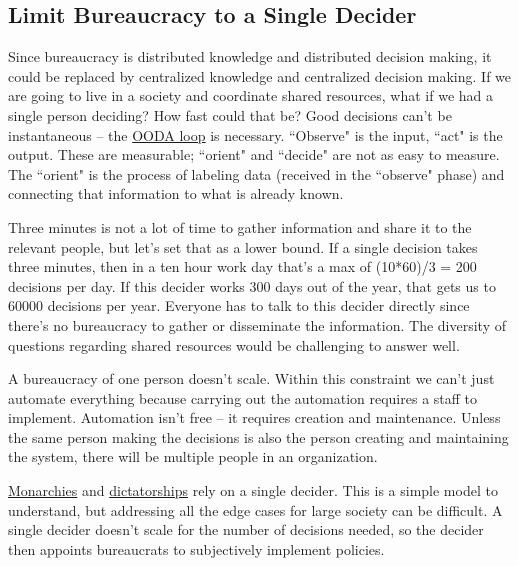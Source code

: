 \subsection{Limit Bureaucracy to a Single Decider\label{sec:single-decider}}

Since bureaucracy is distributed knowledge and distributed decision making, it could be replaced by centralized knowledge and centralized decision making. If we are going to live in a society and coordinate shared resources, what if we had a single person deciding? How fast could that be? Good decisions can't be instantaneous -- the \href{https://en.wikipedia.org/wiki/OODA_loop}{OODA loop} is necessary. 
``Observe" is the input, ``act" is the output. These are measurable; ``orient" and ``decide" are not as easy to measure. The ``orient" is the process of labeling data (received in the ``observe" phase) and connecting that information to what is already known.

Three minutes is not a lot of time to gather information and share it to the relevant people, but let's set that as a lower bound.
If a single decision takes three minutes, then in a ten hour work day that's a max of (10*60)/3 = 200 decisions per day. If this decider works 300 days out of the year, that gets us to 60000 decisions per year. Everyone has to talk to this decider directly since there's no bureaucracy to gather or disseminate the information. The diversity of questions regarding shared resources would be challenging to answer well.

A bureaucracy of one person doesn't scale. Within this constraint we can't just automate everything because carrying out the automation requires a staff to implement. Automation isn't free -- it requires creation and maintenance. Unless the same person making the decisions is also the person creating and maintaining the system, there will be multiple people in an organization.


\href{https://en.wikipedia.org/wiki/Monarchy}{Monarchies} and \href{https://en.wikipedia.org/wiki/Dictator}{dictatorships} rely on a single decider. This is a simple model to understand, but addressing all the edge cases for large society can be difficult. A single decider doesn't scale for the number of decisions needed, so the decider then appoints bureaucrats to subjectively implement policies. 


